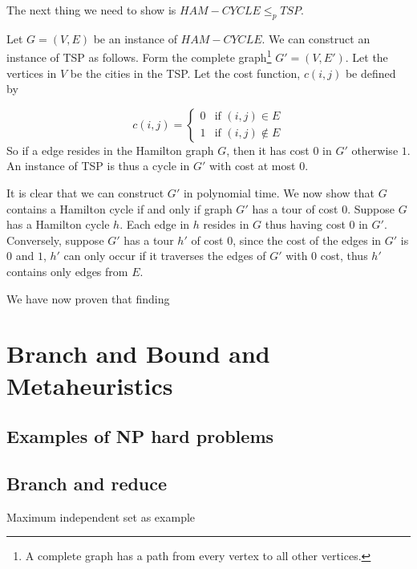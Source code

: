 \documentclass[10pt]{article}
\begin{document}
The next thing we need to show is $HAM-CYCLE \leq_p TSP$. 

Let $G=(V,E)$ be an instance of $HAM-CYCLE$. We can construct an instance of TSP as follows. Form the complete graph\footnote{A complete graph has a path from every vertex to all other vertices.} $G' = (V,E')$. Let the vertices in $V$ be the cities in the TSP. Let the cost function, $c(i,j)$ be defined by

\begin{equation} 
c(i,j) = 
\left\{
\begin{array}{rl} 
  0 & \text{if } (i,j) \in E \\
  1 & \text{if } (i,j) \notin E 
\end{array} 
\right. 
\end{equation} 
So if a edge resides in the Hamilton graph $G$, then it has cost $0$ in $G'$ otherwise $1$. An instance of TSP is thus a cycle in $G'$ with cost at most $0$.

It is clear that we can construct $G'$ in polynomial time. We now show that $G$ contains a Hamilton cycle if and only if graph $G'$ has a tour of cost $0$. Suppose $G$ has a Hamilton cycle $h$. Each edge in $h$ resides in $G$ thus having cost $0$ in $G'$. Conversely, suppose $G'$ has a tour $h'$ of cost $0$, since the cost of the edges in $G'$ is $0$ and $1$, $h'$ can only occur if it traverses the edges of $G'$ with $0$ cost, thus $h'$ contains only edges from $E$.  


We have now proven that finding 


\section{Branch and Bound and Metaheuristics} %
\label{sec:branch_and_bound_and_metaheuristics}


\subsection{Examples of NP hard problems} %
\label{sub:exmaples_of_np_hard_problems}



\subsection{Branch and reduce} %
\label{sub:branch_and_reduce}
Maximum independent set as example
\end{document}
